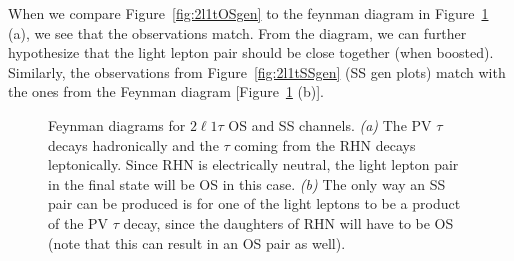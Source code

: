 \documentclass[letterpaper,12pt]{article}
\begin{document}
When we compare Figure~\ref{fig:2l1tOSgen} to the feynman diagram in Figure~\ref{fig:2l1tgenfeyn} (a), we see that the observations match. From the diagram, we can further hypothesize that the light lepton pair should be close together (when boosted). Similarly, the observations from Figure~\ref{fig:2l1tSSgen} (SS gen plots) match with the ones from the Feynman diagram [Figure~\ref{fig:2l1tgenfeyn} (b)].

\begin{figure}[h]
  \centering
  \qquad
  \caption[Feynman diagrams for \2l1t-OS and SS]{Feynman diagrams for $2\ell1\tau$ OS and SS channels. \emph{(a)} The PV $\tau$ decays hadronically and the $\tau$ coming from the RHN decays leptonically. Since RHN is electrically neutral, the light lepton pair in the final state will be OS in this case. \emph{(b)} The only way an SS pair can be produced is for one of the light leptons to be a product of the PV $\tau$ decay, since the daughters of RHN will have to be OS (note that this can result in an OS pair as well).}
  \label{fig:2l1tgenfeyn}
\end{figure}

\clearpage
\end{document}
